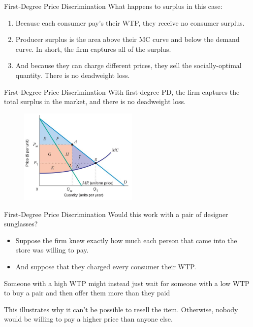 \documentclass[11pt,t]{beamer}
\begin{document}
\begin{frame}{First-Degree Price Discrimination}
  What happens to surplus in this case:

  \begin{enumerate}
    \item Because each consumer pay's their WTP, they receive no consumer surplus.
    
    \item Producer surplus is the area above their MC curve and below the demand curve. In short, the firm captures all of the surplus.
    
    \item And because they can charge different prices, they sell the socially-optimal quantity. There is no deadweight loss.
  \end{enumerate}
\end{frame}

\begin{frame}{First-Degree Price Discrimination}
  With first-degree PD, the firm captures the total surplus in the market, and there is no deadweight loss.

  \begin{figure}
    \includegraphics[width=220px]{figures/fig12_2a.jpg}
  \end{figure}
\end{frame}

\begin{frame}{First-Degree Price Discrimination}
  Would this work with a pair of designer sunglasses?

  \begin{itemize}
    \item Suppose the firm knew exactly how much each person that came into the store was willing to pay.
    
    \item And suppose that they charged every consumer their WTP.
  \end{itemize}
  
  \bigskip\pause
  Someone with a high WTP might instead just wait for someone with a low WTP to buy a pair and then offer them more than they paid

  \bigskip
  This illustrates why it can't be possible to resell the item. Otherwise, nobody would be willing to pay a higher price than anyone else.
\end{frame}
\end{document}
